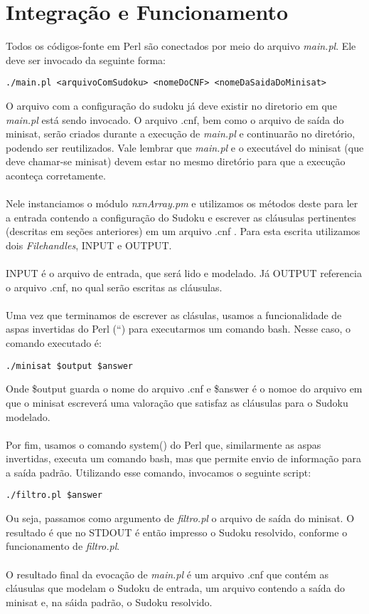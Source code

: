 \documentclass[a4paper]{article}
\begin{document}
\section{Integração e Funcionamento}
Todos os códigos-fonte em Perl são conectados por meio do arquivo \textit{main.pl}. Ele deve ser invocado da seguinte forma:
\begin{verbatim}
./main.pl <arquivoComSudoku> <nomeDoCNF> <nomeDaSaidaDoMinisat> 
\end{verbatim}
O arquivo com a configuração do sudoku já deve existir no diretorio em que \textit{main.pl} está sendo invocado. O arquivo .cnf, bem como o arquivo de saída do minisat, serão criados durante a execução de \textit{main.pl} e continuarão no diretório, podendo ser reutilizados. Vale lembrar que \textit{main.pl} e o executável do minisat (que deve chamar-se minisat) devem estar no mesmo diretório para que a execução aconteça corretamente.\\\\
Nele instanciamos o módulo \textit{nxnArray.pm} e utilizamos os métodos deste para ler a entrada contendo a configuração do Sudoku e escrever as cláusulas pertinentes (descritas em seções anteriores) em um arquivo .cnf . Para esta escrita utilizamos dois \textit{Filehandles}, INPUT e OUTPUT.\\\\
INPUT é o arquivo de entrada, que será lido e modelado. Já OUTPUT referencia o arquivo .cnf, no qual serão escritas as cláusulas.\\\\
Uma vez que terminamos de escrever as clásulas, usamos a funcionalidade de aspas invertidas do Perl (``) para executarmos um comando bash. Nesse caso, o comando executado é:
\begin{verbatim}
./minisat $output $answer
\end{verbatim}
Onde \$output guarda o nome do arquivo .cnf e \$answer é o nomoe do arquivo em que o minisat escreverá uma valoração que satisfaz as cláusulas para o Sudoku modelado.\\\\
Por fim, usamos o comando system() do Perl que, similarmente as aspas invertidas, executa um comando bash, mas que permite envio de informação para a saída padrão. Utilizando esse comando, invocamos o seguinte script:
\begin{verbatim}
./filtro.pl $answer
\end{verbatim}
Ou seja, passamos como argumento de \textit{filtro.pl} o arquivo de saída do minisat. O resultado é que no STDOUT é então impresso o Sudoku resolvido, conforme o funcionamento de \textit{filtro.pl}.\\\\
O resultado final da evocação de \textit{main.pl} é um arquivo .cnf que contém as cláusulas que modelam o Sudoku de entrada, um arquivo contendo a saída do minisat e, na sáida padrão, o Sudoku resolvido.
\end{document}
